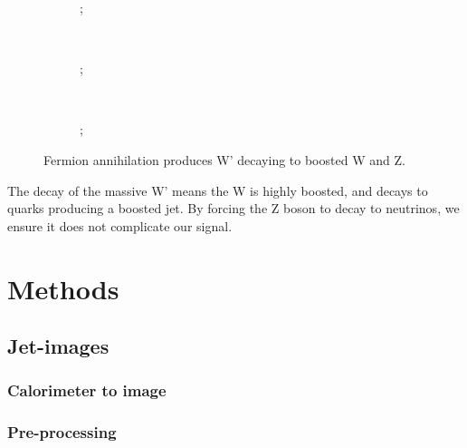 \documentclass{report}
\begin{document}
	\begin{figure}[H]
		\centering
		\begin{subfigure}[t]{0.3\linewidth}
			\centering
			;
		\end{subfigure}%
		~ 
		\begin{subfigure}[t]{0.3\linewidth}
			\centering
			;
		\end{subfigure}
		~
		\begin{subfigure}[t]{0.3\linewidth}
			\centering
			;
		\end{subfigure}
	\caption{Fermion annihilation produces W' decaying to boosted W and Z.}
	\label{fig:feynmans}
	\end{figure}

The decay of the massive W' means the W is highly boosted, and decays to quarks producing a boosted jet. By forcing the Z boson to decay to neutrinos, we ensure it does not complicate our signal.






\chapter{Methods}
\label{sec:methods}

\section{Jet-images}
\subsection{Calorimeter to image}

\subsection{Pre-processing}
\end{document}
